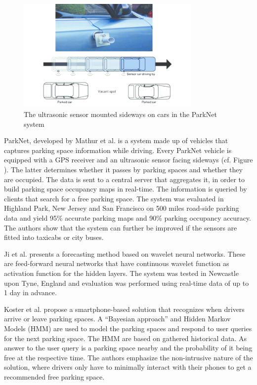 \begin{figure}[!ht]
	\centering
	\includegraphics[width=0.8\textwidth]{graphics/related_work/mathur_1.png}
	\caption{The ultrasonic sensor mounted sideways on cars in the ParkNet system } %
	\label{fig:related_work_mathur}
\end{figure}

ParkNet, developed by Mathur et al. \cite{mathur} is a system made up of vehicles that captures parking space information while driving. Every ParkNet vehicle is equipped with a GPS receiver and an ultrasonic sensor facing sideways (cf. Figure ). The latter determines whether it passes by parking spaces and whether they are occupied. The data is sent to a central server that aggregates it, in order to build parking space occupancy maps in real-time. The information is queried by clients that search for a free parking space. The system was evaluated in Highland Park, New Jersey and San Francisco on 500 miles road-side parking data and yield 95\% accurate parking maps and 90\% parking occupancy accuracy. The authors show that the system can further be improved if the sensors are fitted into taxicabs or city buses.

Ji et al. \cite{ji} presents a forecasting method based on wavelet neural networks. These are feed-forward neural networks that have continuous wavelet function as activation function for the hidden layers. The system was tested in Newcastle upon Tyne, England and evaluation was performed using real-time data of up to 1 day in advance.

Koster et al. \cite{koster} propose a smartphone-based solution that recognizes when drivers arrive or leave parking spaces. A ``Bayesian approach'' and Hidden Markov Models (HMM) are used to model the parking spaces and respond to user queries for the next parking space. The HMM are based on gathered historical data. As answer to the user query is a parking space nearby and the probability of it being free at the respective time. The authors emphasize the non-intrusive nature of the solution, where drivers only have to minimally interact with their phones to get a recommended free parking space.

